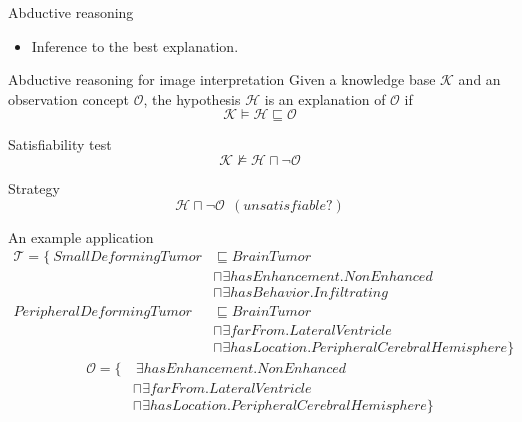 \documentclass{beamer}
\begin{document}
\begin{frame}{Abductive reasoning}
\begin{itemize}
 \item Inference to the best explanation.
\end{itemize}
\begin{block}{Abductive reasoning for image interpretation}
 Given a knowledge base $\mathcal{K}$ and an observation concept $\mathcal{O}$, the  hypothesis $\mathcal{H}$ is an explanation of  $\mathcal{O}$ if  $$\mathcal{K}\vDash \mathcal{H}\sqsubseteq \mathcal{O}$$
\end{block}

\begin{block}{Satisfiability test}
$$\mathcal{K}\nvDash \mathcal{H}\sqcap \neg \mathcal{O}$$
\end{block}

\begin{exampleblock}{Strategy}
 $$\mathcal{H}\sqcap \neg\mathcal{O}~~(unsatisfiable?)$$ 
 
\end{exampleblock}
\end{frame}

\begin{frame}{An example application}
 \begin{align*}
\mathcal{T}=\{~SmallDeformingTumor &\sqsubseteq BrainTumor\\
 &\sqcap \exists hasEnhancement. NonEnhanced \\
&\sqcap \exists hasBehavior. Infiltrating  \\
PeripheralDeformingTumor &\sqsubseteq BrainTumor\\
& \sqcap \exists farFrom. LateralVentricle \\
& \sqcap \exists hasLocation. PeripheralCerebralHemisphere \} 
\end{align*}\vspace{-0.9cm}
\begin{align*}
\mathcal{O} =\{&~\exists hasEnhancement. NonEnhanced \\
 &\sqcap \exists farFrom. LateralVentricle \\
&\sqcap \exists hasLocation. PeripheralCerebralHemisphere \} 
\end{align*}
\end{frame}
\end{document}
